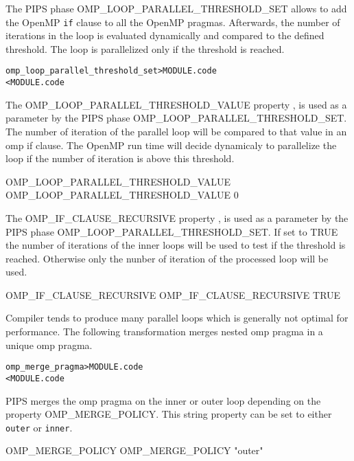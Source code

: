 \documentclass[a4paper]{report}
\newenvironment{PipsMake}{\begin{alltt}}{\end{alltt}}
\newenvironment{PipsPass}[1]{\label{pass:#1}}{}
\begin{document}
\begin{PipsPass}{omp_loop_parallel_threshold_set}
The PIPS phase  OMP\_LOOP\_PARALLEL\_THRESHOLD\_SET allows to add the OpenMP
\verb|if| clause to all the OpenMP pragmas. Afterwards, the number of iterations
in the loop is evaluated dynamically and compared to the defined threshold.
The loop is parallelized only if the threshold is reached.
\end{PipsPass}

\begin{PipsMake}
omp_loop_parallel_threshold_set             > MODULE.code
        < MODULE.code
\end{PipsMake}

The OMP\_LOOP\_PARALLEL\_THRESHOLD\_VALUE property , is used as a parameter by the
PIPS phase OMP\_LOOP\_PARALLEL\_THRESHOLD\_SET. The number of iteration of the
parallel loop will be compared to that value in an omp if clause. The OpenMP
run time will decide dynamicaly to parallelize the loop if the number of
iteration is above this threshold.
\begin{PipsProp}{OMP_LOOP_PARALLEL_THRESHOLD_VALUE}
OMP_LOOP_PARALLEL_THRESHOLD_VALUE 0
\end{PipsProp}

The OMP\_IF\_CLAUSE\_RECURSIVE property , is used as a parameter by the
PIPS phase OMP\_LOOP\_PARALLEL\_THRESHOLD\_SET. If set to TRUE the number
of iterations of the inner loops will be used to test if the threshold is
reached. Otherwise only the nunber of iteration of the processed loop will be
used.
\begin{PipsProp}{OMP_IF_CLAUSE_RECURSIVE}
OMP_IF_CLAUSE_RECURSIVE TRUE
\end{PipsProp}

\begin{PipsPass}{omp_merge_pragma}
  Compiler tends to produce many parallel loops which is generally not
  optimal for performance. The following transformation merges nested
  omp pragma in a unique omp pragma.
\end{PipsPass}

\begin{PipsMake}
omp_merge_pragma             > MODULE.code
        < MODULE.code
\end{PipsMake}

PIPS merges the omp pragma on the inner or outer loop depending on the
property OMP\_MERGE\_POLICY. This string property can be set to either
\verb|outer| or \verb|inner|.
\begin{PipsProp}{OMP_MERGE_POLICY}
OMP_MERGE_POLICY "outer"
\end{PipsProp}
\end{document}
